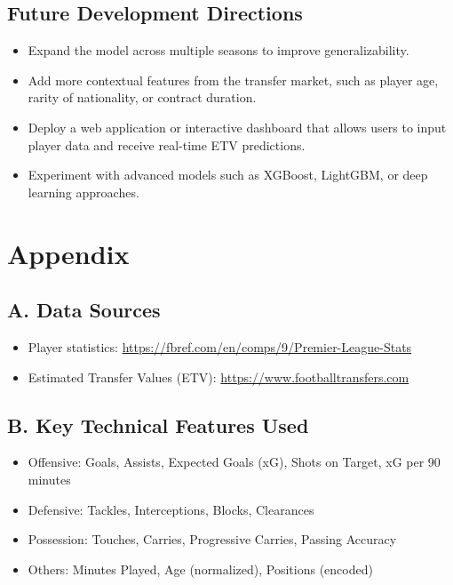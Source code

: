 \documentclass[12pt,a4paper]{article}
\begin{document}
\subsection{Future Development Directions}
\begin{itemize}
    \item Expand the model across multiple seasons to improve generalizability.
    \item Add more contextual features from the transfer market, such as player age, rarity of nationality, or contract duration.
    \item Deploy a web application or interactive dashboard that allows users to input player data and receive real-time ETV predictions.
    \item Experiment with advanced models such as XGBoost, LightGBM, or deep learning approaches.
\end{itemize}


\section*{Appendix}

\subsection*{A. Data Sources}
\begin{itemize}
    \item Player statistics: \url{https://fbref.com/en/comps/9/Premier-League-Stats}
    \item Estimated Transfer Values (ETV): \url{https://www.footballtransfers.com}
\end{itemize}

\subsection*{B. Key Technical Features Used}
\begin{itemize}
    \item Offensive: Goals, Assists, Expected Goals (xG), Shots on Target, xG per 90 minutes
    \item Defensive: Tackles, Interceptions, Blocks, Clearances
    \item Possession: Touches, Carries, Progressive Carries, Passing Accuracy
    \item Others: Minutes Played, Age (normalized), Positions (encoded)
\end{itemize}
\end{document}
